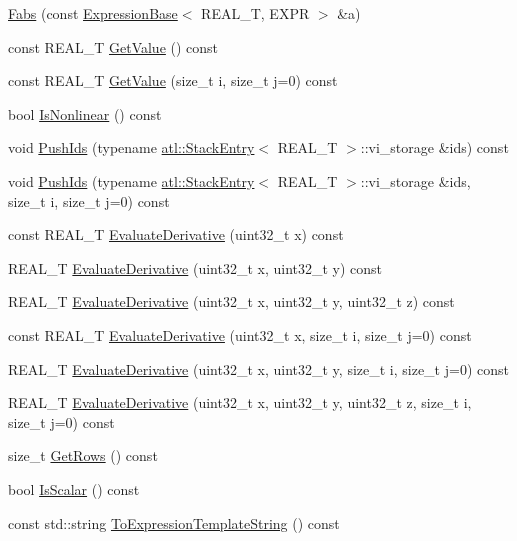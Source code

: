 \begin{DoxyCompactItemize}
\item 
\hyperlink{structatl_1_1_fabs_a209f2e5eef31610984955cc8c397a31b}{Fabs} (const \hyperlink{structatl_1_1_expression_base}{Expression\+Base}$<$ R\+E\+A\+L\+\_\+\+T, E\+X\+P\+R $>$ \&a)
\item 
const R\+E\+A\+L\+\_\+\+T \hyperlink{structatl_1_1_fabs_ac8ccc3d35e00f868a9d72cd7427005aa}{Get\+Value} () const 
\item 
const R\+E\+A\+L\+\_\+\+T \hyperlink{structatl_1_1_fabs_ac3ab5f58693e26604421c4705b8e26e5}{Get\+Value} (size\+\_\+t i, size\+\_\+t j=0) const 
\item 
bool \hyperlink{structatl_1_1_fabs_a10e7071a17ffa1319f200569a1b22ade}{Is\+Nonlinear} () const 
\item 
void \hyperlink{structatl_1_1_fabs_a515bb4e9b6c9aa45771a1e9d171b0874}{Push\+Ids} (typename \hyperlink{structatl_1_1_stack_entry}{atl\+::\+Stack\+Entry}$<$ R\+E\+A\+L\+\_\+\+T $>$\+::vi\+\_\+storage \&ids) const 
\item 
void \hyperlink{structatl_1_1_fabs_a6591506f92da3e4526865b0ac0362e9d}{Push\+Ids} (typename \hyperlink{structatl_1_1_stack_entry}{atl\+::\+Stack\+Entry}$<$ R\+E\+A\+L\+\_\+\+T $>$\+::vi\+\_\+storage \&ids, size\+\_\+t i, size\+\_\+t j=0) const 
\item 
const R\+E\+A\+L\+\_\+\+T \hyperlink{structatl_1_1_fabs_affe4a7b048c33b8e0ae05186b1a52086}{Evaluate\+Derivative} (uint32\+\_\+t x) const 
\item 
R\+E\+A\+L\+\_\+\+T \hyperlink{structatl_1_1_fabs_abf10b45ec3e8c295bec9f9f4acc0f30d}{Evaluate\+Derivative} (uint32\+\_\+t x, uint32\+\_\+t y) const 
\item 
R\+E\+A\+L\+\_\+\+T \hyperlink{structatl_1_1_fabs_abfd108ac8bacee559ba29b9a3a89782b}{Evaluate\+Derivative} (uint32\+\_\+t x, uint32\+\_\+t y, uint32\+\_\+t z) const 
\item 
const R\+E\+A\+L\+\_\+\+T \hyperlink{structatl_1_1_fabs_ad9f2521ad8de8ecc5f5c2becda8cdc5a}{Evaluate\+Derivative} (uint32\+\_\+t x, size\+\_\+t i, size\+\_\+t j=0) const 
\item 
R\+E\+A\+L\+\_\+\+T \hyperlink{structatl_1_1_fabs_a95bda969d49d5b5b67b3a195cb6a77f7}{Evaluate\+Derivative} (uint32\+\_\+t x, uint32\+\_\+t y, size\+\_\+t i, size\+\_\+t j=0) const 
\item 
R\+E\+A\+L\+\_\+\+T \hyperlink{structatl_1_1_fabs_a84ba8df8b0dfe44681db684598b5a134}{Evaluate\+Derivative} (uint32\+\_\+t x, uint32\+\_\+t y, uint32\+\_\+t z, size\+\_\+t i, size\+\_\+t j=0) const 
\item 
size\+\_\+t \hyperlink{structatl_1_1_fabs_a34d34b2066fea0f12831e4d328d0bf02}{Get\+Rows} () const 
\item 
bool \hyperlink{structatl_1_1_fabs_ada0a07c884510106cc0ac10cc49ff422}{Is\+Scalar} () const 
\item 
const std\+::string \hyperlink{structatl_1_1_fabs_aefc940a9b227fbc1af622a12c3255583}{To\+Expression\+Template\+String} () const 
\end{DoxyCompactItemize}
